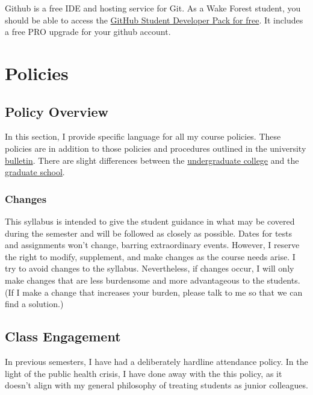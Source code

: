 \documentclass[
]{book}
\begin{document}
Github is a free IDE and hosting service for Git. As a Wake Forest student, you should be able to access the \href{https://education.github.com/benefits?type=student}{GitHub Student Developer Pack for free}. It includes a free PRO upgrade for your github account.

\hypertarget{part-policies}{%
\part*{Policies}\label{part-policies}}

\hypertarget{policy-overview}{%
\chapter{Policy Overview}\label{policy-overview}}

In this section, I provide specific language for all my course policies. These policies are in addition to those policies and procedures outlined in the university \href{https://bulletin.wfu.edu}{bulletin}. There are slight differences between the \href{https://bulletin.wfu.edu/undergraduate/}{undergraduate college} and the \href{https://bulletin.wfu.edu/graduate/}{graduate school}.

\hypertarget{changes}{%
\section{Changes}\label{changes}}

This syllabus is intended to give the student guidance in what may be covered during the semester and will be followed as closely as possible.
Dates for tests and assignments won't change, barring extraordinary events.
However, I reserve the right to modify, supplement, and make changes as the course needs arise.
I try to avoid changes to the syllabus.
Nevertheless, if changes occur, I will only make changes that are less burdensome and more advantageous to the students.
(If I make a change that increases your burden, please talk to me so that we can find a solution.)

\hypertarget{class-engagement}{%
\chapter{Class Engagement}\label{class-engagement}}

In previous semesters, I have had a deliberately hardline attendance policy.
In the light of the public health crisis, I have done away with the this policy, as it doesn't align with my general philosophy of treating students as junior colleagues.
\end{document}
